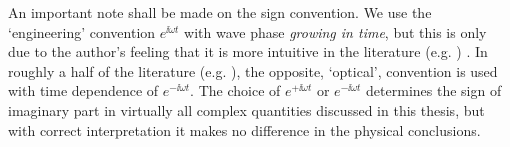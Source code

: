 An important note shall be made on the sign convention. We use the `engineering' convention $e^{\ii \omega t}$ with wave phase \textit{growing in time}, but this is only due to the author's feeling that it is more intuitive in the literature 
(e.g. \cite[p. 9]{engheta2006book}
\cite[pp. 21, 99]{krowne2007book}
\cite[chap. 1-4, 6, 9, 10]{eleftheriades2005book})
. In roughly a half of the literature
(e.g. \cite{jackson1962book} 
\cite{veselago1968} 
\cite{born1966book}
\cite[chap. 5, 7, 8]{eleftheriades2005book}), the opposite, `optical', convention is used with time dependence of $e^{-\ii \omega t}$. 
The choice of $e^{+\ii\omega t}$ or $e^{-\ii\omega t}$ determines the sign of imaginary part in virtually all complex quantities discussed in this thesis, but with correct interpretation it makes no difference in the physical conclusions.

